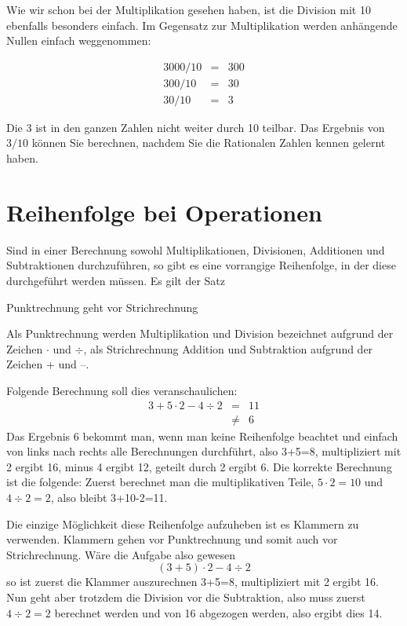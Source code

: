 Wie wir schon bei der Multiplikation gesehen haben, ist die Division mit 10 ebenfalls besonders einfach. Im Gegensatz zur Multiplikation werden anhängende Nullen einfach weggenommen:

\begin{eqnarray*}
3000 / 10 &=& 300 \\
300 / 10 &=& 30 \\
30 / 10 &=& 3
\end{eqnarray*}

Die 3 ist in den ganzen Zahlen nicht weiter durch 10 teilbar. Das Ergebnis von $3/10$ können Sie berechnen, nachdem Sie die Rationalen Zahlen kennen gelernt haben. 

\section{Reihenfolge bei Operationen}

Sind in einer Berechnung sowohl Multiplikationen, Divisionen, Additionen und Subtraktionen durchzuführen, so gibt es eine vorrangige Reihenfolge, in der diese durchgeführt werden müssen. Es gilt der Satz

\begin{svgraybox}
Punktrechnung geht vor Strichrechnung
\end{svgraybox}

\noindent Als Punktrechnung werden Multiplikation und Division bezeichnet aufgrund der Zeichen $\cdot$ und $\div$, als Strichrechnung Addition und Subtraktion aufgrund der Zeichen + und --.

Folgende Berechnung soll dies veranschaulichen:
\begin{eqnarray*}
3+5\cdot 2-4\div 2 &=&  11 \\
&\ne & 6
\end{eqnarray*}
Das Ergebnis 6 bekommt man, wenn man keine Reihenfolge beachtet und einfach von links nach rechts alle Berechnungen durchführt, also 3+5=8, multipliziert mit 2 ergibt 16, minus 4 ergibt 12, geteilt durch 2 ergibt 6. Die korrekte Berechnung ist die folgende: Zuerst berechnet man die multiplikativen Teile, $5\cdot 2=10$ und $4\div 2=2$, also bleibt 3+10-2=11.

Die einzige Möglichkeit diese Reihenfolge aufzuheben ist es Klammern zu verwenden. Klammern gehen vor Punktrechnung und somit auch vor Strichrechnung. Wäre die Aufgabe also gewesen
\[
(3+5)\cdot 2-4\div 2
\]
so ist zuerst die Klammer auszurechnen 3+5=8, multipliziert mit 2 ergibt 16. Nun geht aber trotzdem die Division vor die Subtraktion, also muss zuerst $4\div 2=2$ berechnet werden und von 16 abgezogen werden, also ergibt dies 14.

